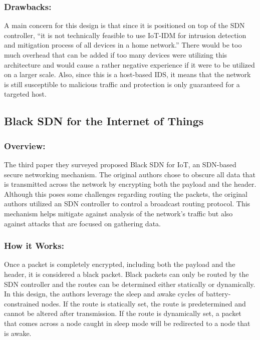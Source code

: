 \subsubsection {Drawbacks:}
\smallskip

A main concern for this design is that since it is positioned on top of the SDN controller, “it is not technically feasible to use IoT-IDM for intrusion detection and mitigation process of all devices in a home network.” \cite {nobakht2016host} There would be too much overhead that can be added if too many devices were utilizing this architecture and would cause a rather negative experience if it were to be utilized on a larger scale. Also, since this is a host-based IDS, it means that the network is still susceptible to malicious traffic and protection is only guaranteed for a targeted host. 

\subsection {Black SDN for the Internet of Things}
\subsubsection {Overview:}
\smallskip

The third paper they surveyed proposed Black SDN for IoT, an SDN-based secure networking mechanism. The original authors chose to obscure all data that is transmitted across the network by encrypting both the payload and the header. Although this poses some challenges regarding routing the packets, the original authors utilized an SDN controller to control a broadcast routing protocol. This mechanism helps mitigate against analysis of the network’s traffic but also against attacks that are focused on gathering data.

\subsubsection {How it Works:}
\smallskip

Once a packet is completely encrypted, including both the payload and the header, it is considered a black packet. Black packets can only be routed by the SDN controller and the routes can be determined either statically or dynamically. In this design, the authors leverage the sleep and awake cycles of battery-constrained nodes. If the route is statically set, the route is predetermined and cannot be altered after transmission. If the route is dynamically set, a packet that comes across a node caught in sleep mode will be redirected to a node that is awake.
